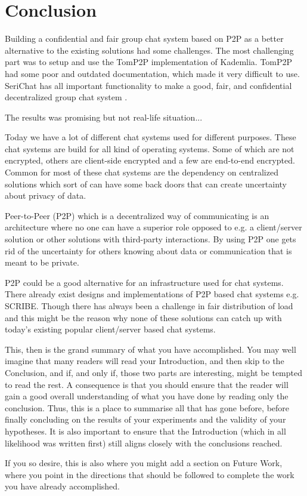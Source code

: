 \chapter{Conclusion}
\label{cha:conclusion}
Building a confidential and fair group chat system based on P2P as a better alternative to the existing solutions had some challenges. 
The most challenging part was to setup and use the TomP2P implementation of Kademlia. TomP2P had some poor and outdated documentation, which made it very difficult to use.  
SeriChat has all important functionality to make a good, fair, and confidential decentralized group chat system  \cite{matl2015effective}. 


The results was promising but not real-life situation...




Today we have a lot of different chat systems used for different purposes. These chat systems are build for all kind of operating systems. 
Some of which are not encrypted, others are client-side encrypted and a few are end-to-end encrypted. Common for most of these chat systems are the dependency on centralized solutions which sort of can have some back doors that can create uncertainty about privacy of data. 

Peer-to-Peer (P2P) which is a decentralized way of communicating is an architecture where no one can have a superior role opposed to e.g. a client/server solution or other solutions with third-party interactions. By using P2P one gets rid of the uncertainty for others knowing about data or communication that is meant to be private. 

P2P could be a good alternative for an infrastructure used for chat systems. There already exist designs and implementations of P2P based chat systems e.g. SCRIBE. Though there has always been a challenge in fair distribution of load and this might be the reason why none of these solutions can catch up with today's existing popular client/server based chat systems.  










This, then is the grand summary of what you have accomplished.  You
may well imagine that many readers will read your Introduction, and
then skip to the Conclusion, and if, and only if, those two parts are
interesting, might be tempted to read the rest. A consequence is that
you should ensure that the reader will gain a good overall
understanding of what you have done by reading only the conclusion.
Thus, this is a place to summarise all that has gone before, before
finally concluding on the results of your experiments and the validity
of your hypotheses. It is also important to ensure that the
Introduction (which in all likelihood was written first) still aligns
closely with the conclusions reached.

If you so desire, this is also where you might add a section on Future
Work, where you point in the directions that should be followed to
complete the work you have already accomplished.

